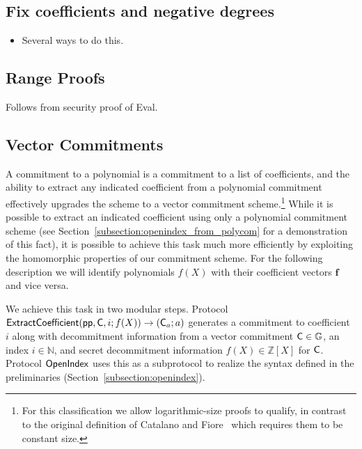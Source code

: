 \documentclass{article}
\theoremstyle{definition}
\begin{document}
\subsection{Fix coefficients and negative degrees}
\begin{itemize}
	\item Several ways to do this.
\end{itemize}

\subsection{Range Proofs}

Follows from security proof of Eval.

\subsection{Vector Commitments}

A commitment to a polynomial is a commitment to a list of coefficients, and the ability to extract any indicated coefficient from a polynomial commitment effectively upgrades the scheme to a vector commitment scheme.\footnote{For this classification we allow logarithmic-size proofs to qualify, in contrast to the original definition of Catalano and Fiore~\cite{PKC:CatFio13} which requires them to be constant size.} While it is possible to extract an indicated coefficient using only a polynomial commitment scheme (see Section~\ref{subsection:openindex_from_polycom} for a demonstration of this fact), it is possible to achieve this task much more efficiently by exploiting the homomorphic properties of our commitment scheme. For the following description we will identify polynomials $f(X)$ with their coefficient vectors $\mathbf{f}$ and vice versa.

We achieve this task in two modular steps. Protocol $\textsf{{ExtractCoefficient}}(\textsf{pp}, \mathsf{C}, i; f(X)) \rightarrow (\mathsf{C}_a; a)$ generates a commitment to coefficient $i$ along with decommitment information from a vector commitment $\mathsf{C} \in \mathbb{G}$, an index $i \in \mathbb{N}$, and secret decommitment information $f(X) \in \mathbb{Z}[X]$ for $\mathsf{C}$. Protocol $\textsf{{OpenIndex}}$ uses this as a subprotocol to realize the syntax defined in the preliminaries (Section~\ref{subsection:openindex}). 
\end{document}
